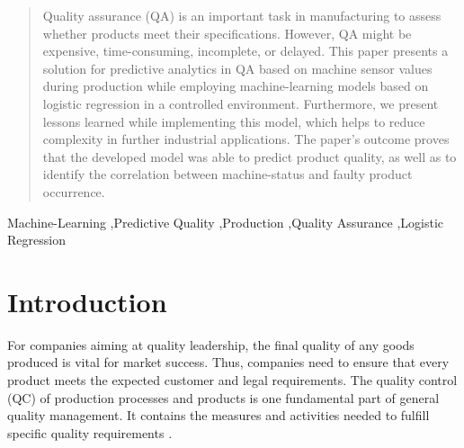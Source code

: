 \documentclass[5p,times,procedia]{elsarticle}
\begin{document}
\begin{frontmatter}
\begin{abstract}
Quality assurance (QA) is an important task in manufacturing to assess whether products 
meet their specifications. However, QA might be expensive, time-consuming, incomplete, or delayed.
This paper presents a solution for predictive analytics in QA based on machine sensor values during
production while employing machine-learning models based on logistic regression in a controlled environment. 
Furthermore, we present lessons learned while implementing this model, which helps to reduce complexity in
further industrial applications. The paper’s outcome proves that the developed model was able to predict
product quality, as well as to identify the correlation between machine-status and faulty product occurrence.
\end{abstract}

\begin{keyword}
Machine-Learning \sep Predictive Quality \sep Production \sep Quality Assurance \sep Logistic Regression 




\end{keyword}

\end{frontmatter}


\section{Introduction} %

For companies aiming at quality leadership, the final quality of any goods produced is vital for market success. Thus, companies need to ensure that every product meets the expected customer and legal requirements.
The quality control (QC) of production processes and products is one fundamental part of general quality management. It contains the measures and activities needed to fulfill specific quality requirements \cite{mitra2016fundamentals}.
\end{document}
